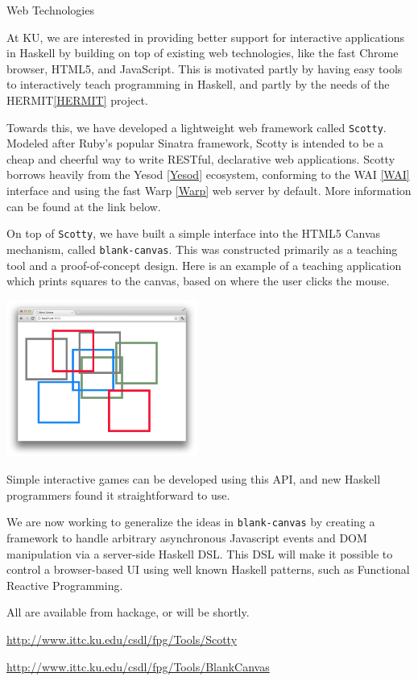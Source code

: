 \begin{hcarentry}{Web Technologies}
\label{kuwebtech}
\makeheader

At KU, we are interested in providing better support for
interactive applications in Haskell by building on top of existing web technologies,
like the fast Chrome browser, HTML5, and JavaScript. This is motivated
partly by having easy tools to interactively teach programming in Haskell,
and partly by the needs of the HERMIT\cref{HERMIT} project.

Towards this, we have developed a lightweight web framework called {\tt Scotty}.
Modeled after Ruby's popular Sinatra framework, Scotty is intended to
be a cheap and cheerful way to write RESTful, declarative web applications.
Scotty borrows heavily from the Yesod \cref{Yesod} ecosystem, conforming
to the WAI \cref{WAI} interface and using the fast Warp \cref{Warp} web server
by default. More information can be found at the link below.

On top of {\tt Scotty}, we have built a simple interface
into the HTML5 Canvas mechanism, called {\tt blank-canvas}.
This was constructed primarily as a teaching tool and
a proof-of-concept design. Here is an example of
a teaching application which prints squares to the canvas,
based on where the user clicks the mouse.

\includegraphics[width=0.47\textwidth]{html/squares.png}

Simple interactive games can be developed using this API,
and new Haskell programmers found it straightforward to use.

We are now working to generalize the ideas in {\tt blank-canvas} by
creating a framework to handle arbitrary asynchronous Javascript events
and DOM manipulation via a server-side Haskell DSL. This DSL will make it possible to control
a browser-based UI using well known Haskell patterns, such as Functional
Reactive Programming.

All are available from hackage, or will be shortly.

\FurtherReading
\begin{compactitem}
  \item \url{http://www.ittc.ku.edu/csdl/fpg/Tools/Scotty}
  \item \url{http://www.ittc.ku.edu/csdl/fpg/Tools/BlankCanvas}
\end{compactitem}

\end{hcarentry}
